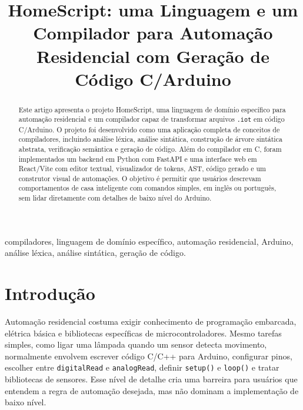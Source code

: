 \documentclass[conference]{IEEEtran}
\begin{document}
\title{HomeScript: uma Linguagem e um Compilador para Automação Residencial com Geração de Código C/Arduino}

\author{
}

\maketitle

\begin{abstract}
Este artigo apresenta o projeto HomeScript, uma linguagem de domínio específico para automação residencial e um compilador capaz de transformar arquivos \texttt{.iot} em código C/Arduino. O projeto foi desenvolvido como uma aplicação completa de conceitos de compiladores, incluindo análise léxica, análise sintática, construção de árvore sintática abstrata, verificação semântica e geração de código. Além do compilador em C, foram implementados um backend em Python com FastAPI e uma interface web em React/Vite com editor textual, visualizador de tokens, AST, código gerado e um construtor visual de automações. O objetivo é permitir que usuários descrevam comportamentos de casa inteligente com comandos simples, em inglês ou português, sem lidar diretamente com detalhes de baixo nível do Arduino.
\end{abstract}

\begin{IEEEkeywords}
compiladores, linguagem de domínio específico, automação residencial, Arduino, análise léxica, análise sintática, geração de código.
\end{IEEEkeywords}

\section{Introdução}

Automação residencial costuma exigir conhecimento de programação embarcada, elétrica básica e bibliotecas específicas de microcontroladores. Mesmo tarefas simples, como ligar uma lâmpada quando um sensor detecta movimento, normalmente envolvem escrever código C/C++ para Arduino, configurar pinos, escolher entre \texttt{digitalRead} e \texttt{analogRead}, definir \texttt{setup()} e \texttt{loop()} e tratar bibliotecas de sensores. Esse nível de detalhe cria uma barreira para usuários que entendem a regra de automação desejada, mas não dominam a implementação de baixo nível.
\end{document}
